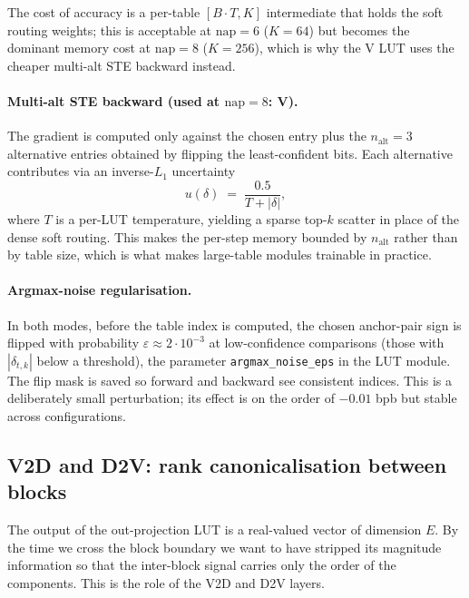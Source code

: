 \documentclass[11pt]{article}
\begin{document}
The cost of accuracy is a per-table $[B \cdot T, K]$ intermediate that holds the soft routing weights; this is acceptable at $\text{nap}=6$ ($K = 64$) but becomes the dominant memory cost at $\text{nap}=8$ ($K = 256$), which is why the V LUT uses the cheaper multi-alt STE backward instead.

\paragraph{Multi-alt STE backward (used at $\text{nap}=8$: V).}
The gradient is computed only against the chosen entry plus the $n_{\text{alt}} = 3$ alternative entries obtained by flipping the least-confident bits.
Each alternative contributes via an inverse-$L_1$ uncertainty
\begin{equation}
    u(\delta) \;=\; \frac{0.5}{T + |\delta|},
\end{equation}
where $T$ is a per-LUT temperature, yielding a sparse top-$k$ scatter in place of the dense soft routing.
This makes the per-step memory bounded by $n_{\text{alt}}$ rather than by table size, which is what makes large-table modules trainable in practice.

\paragraph{Argmax-noise regularisation.}
In both modes, before the table index is computed, the chosen anchor-pair sign is flipped with probability $\varepsilon \approx 2 \cdot 10^{-3}$ at low-confidence comparisons (those with $|\delta_{t,k}|$ below a threshold), the parameter \texttt{argmax\_noise\_eps} in the LUT module.
The flip mask is saved so forward and backward see consistent indices.
This is a deliberately small perturbation; its effect is on the order of $-0.01$ bpb but stable across configurations.

\subsection{V2D and D2V: rank canonicalisation between blocks}
\label{sec:current:v2d}

The output of the out-projection LUT is a real-valued vector of dimension $E$.
By the time we cross the block boundary we want to have stripped its magnitude information so that the inter-block signal carries only the order of the components.
This is the role of the V2D and D2V layers.
\end{document}
